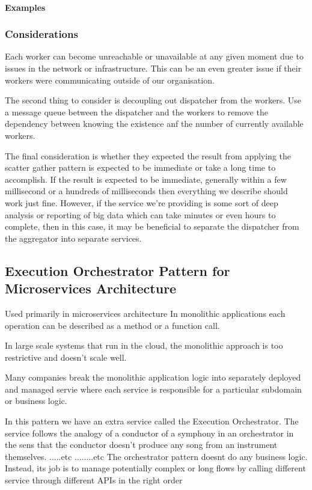 \documentclass[a4paper, 11pt]{book}
\begin{document}
    \paragraph{Examples}

    \subsubsection{Considerations}

    Each worker can become unreachable or unavailable at any given moment due to issues in the network or infrastructure.
    This can be an even greater issue if their workers were communicating outside of our organisation.

    The second thing to consider is decoupling out dispatcher from the workers.
    Use a message queue between the dispatcher and the workers to remove the dependency between knowing the existence anf the number of currently available workers.

    The final consideration is whether they expected the result from applying the scatter gather pattern is expected to be immediate or take a long time to accomplish.
    If the result is expected to be immediate, generally within a few millisecond or a hundreds of milliseconds then everything we describe should work just fine.
    However, if the service we're providing is some sort of deep analysis or reporting of big data which can take minutes or even hours to complete, then in this case, it may be beneficial to separate the dispatcher from the aggregator into separate services.

    \subsection{Execution Orchestrator Pattern for Microservices Architecture}
    Used primarily in microservices architecture
    In monolithic applications each operation can be described as a method or a function call.

    In large scale systems that run in the cloud, the monolithic approach is too restrictive and doesn't scale well.

    Many companies break the monolithic application logic into separately deployed and managed servie where each service is responsible for a particular subdomain or business logic.

    In this pattern we have an extra service called the Execution Orchestrator.
    The service follows the analogy of a conductor of a symphony in an orchestrator in the sens that the conductor doesn't produce any song from an instrument themselves.
    .....etc ........etc
    The orchestrator pattern doesnt do any business logic.
    Instead, its job is to manage potentially complex or long flows by calling different service through different APIs in the right order
\end{document}
